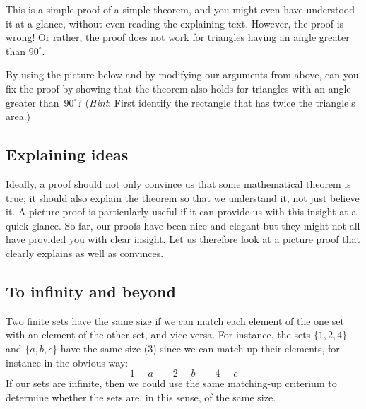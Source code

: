 \medskip
This is a simple proof of a simple theorem,
and you might even have understood it at a glance,
without even reading the explaining text.
However, the proof is wrong!
Or rather, the proof does not work for triangles having
an angle greater than $90^\circ$.

By using the picture below and by modifying our arguments from above,
can you fix the proof by showing that the theorem also holds for
triangles with an angle greater than~$90^\circ$?
({\em Hint}: First identify the rectangle that has twice the triangle's area.)
\begin{center}
\end{center}

\medskip

\subsection*{Explaining ideas}
\noindent
Ideally, a proof should not only convince us that some mathematical theorem is true;
it should also explain the theorem so that we understand it, not just believe it.
A picture proof is particularly useful if it can provide us with this insight
at a quick glance.
So far, our proofs have been nice and elegant
but they might not all have provided you with clear insight.
Let us therefore look at a picture proof that clearly explains as well as convinces.

\medskip

\subsection*{To infinity and beyond}
\noindent
Two finite sets have the same size if we can match each element of the one set
with an element of the other set, and vice versa. For instance,
the sets $\{1,2,4\}$ and $\{a,b,c\}$ have the same size (3)
since we can match up their elements, for instance in the obvious way:
\[
  1 \,\text{---}\, a \qquad
  2 \,\text{---}\, b \qquad
  4 \,\text{---}\, c
\]
If our sets are infinite, then we could use the same matching-up criterium
to determine whether the sets are, in this sense, of the same size.

